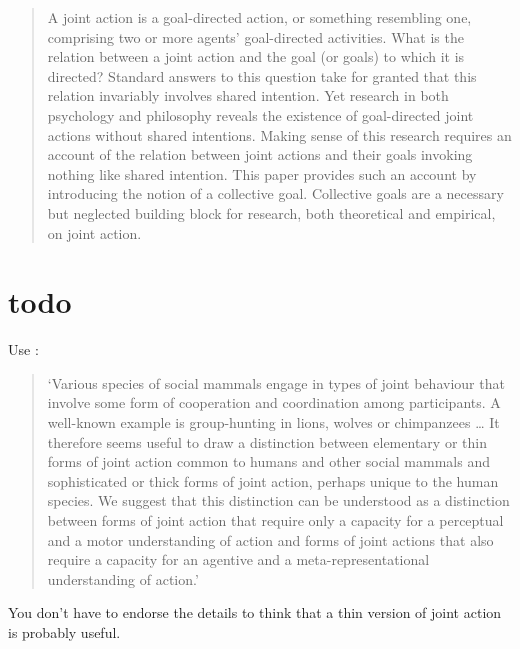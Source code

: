 \documentclass[12pt,a4paper]{extarticle}
\begin{document}
\setlength\footnotesep{1em}


\maketitle

\begin{abstract}
A joint action is a goal-directed action, or something resembling one, comprising two or more agents' goal-directed activities.  
What is the relation between a joint action and the goal (or goals) to which it is directed?  
Standard answers to this question take for granted that  this relation invariably involves shared intention.  
Yet research in both psychology and philosophy reveals the existence of goal-directed joint actions without shared intentions.
Making sense of this research requires an account of the relation between joint actions and their goals invoking nothing like shared intention.
This paper provides such an account by introducing the notion of a collective goal.
Collective goals are a necessary but neglected building block for research, both theoretical and empirical, on joint action.

\end{abstract}


\section{todo}

Use \citep{Pacherie:2006dl}:
\begin{quote}
`Various species of social mammals engage in types of joint behaviour that involve some form of cooperation and coordination among participants. A well-known example is group-hunting in lions, wolves or chimpanzees \ldots
It therefore seems useful to draw a distinction between elementary or thin forms of joint action common to humans and other social mammals and sophisticated or thick forms of joint action, perhaps unique to the human species. 
We suggest that this distinction can be understood as a distinction between forms of joint action that require only a capacity for a perceptual and a motor understanding of action and forms of joint actions that also require a capacity for an agentive and a meta-representational understanding of action.'
\end{quote}
%
You don't have to endorse the details to think that a thin version of joint action is probably useful.
\end{document}
